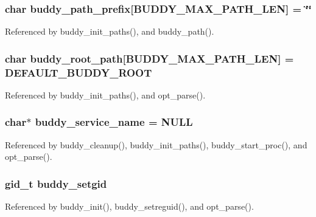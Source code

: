 \subsubsection[{buddy\_\-path\_\-prefix}]{\setlength{\rightskip}{0pt plus 5cm}char {\bf buddy\_\-path\_\-prefix}[BUDDY\_\-MAX\_\-PATH\_\-LEN] = \char`\"{}\char`\"{}\hspace{0.3cm}{\ttfamily  [static]}}\label{buddy_8c_aab6fb913e9f0fd28fb410b3b877aafae}


Referenced by buddy\_\-init\_\-paths(), and buddy\_\-path().

\subsubsection[{buddy\_\-root\_\-path}]{\setlength{\rightskip}{0pt plus 5cm}char {\bf buddy\_\-root\_\-path}[BUDDY\_\-MAX\_\-PATH\_\-LEN] = DEFAULT\_\-BUDDY\_\-ROOT}\label{buddy_8c_a9715b970fd956abacde0cff8a337e0c4}


Referenced by buddy\_\-init\_\-paths(), and opt\_\-parse().

\subsubsection[{buddy\_\-service\_\-name}]{\setlength{\rightskip}{0pt plus 5cm}char$\ast$ {\bf buddy\_\-service\_\-name} = NULL}\label{buddy_8c_a46bdaaaea058028488e4a2fa4abcf80b}


Referenced by buddy\_\-cleanup(), buddy\_\-init\_\-paths(), buddy\_\-start\_\-proc(), and opt\_\-parse().

\subsubsection[{buddy\_\-setgid}]{\setlength{\rightskip}{0pt plus 5cm}gid\_\-t {\bf buddy\_\-setgid}}\label{buddy_8c_a94f0c0963c51ae59585d090bd146267c}


Referenced by buddy\_\-init(), buddy\_\-setreguid(), and opt\_\-parse().

